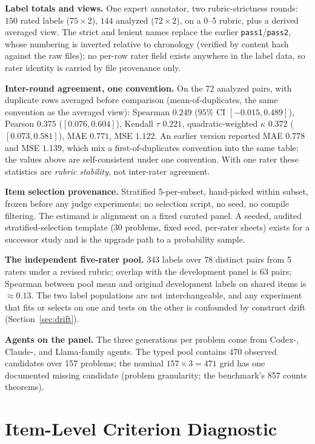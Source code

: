 \documentclass{article}
\begin{document}
\textbf{Label totals and views.}
One expert annotator, two rubric-strictness rounds: $150$ rated labels ($75 \times 2$), $144$ analyzed ($72 \times 2$), on a 0--5 rubric, plus a derived averaged view.
The strict and lenient names replace the earlier \texttt{pass1}/\texttt{pass2}, whose numbering is inverted relative to chronology (verified by content hash against the raw files); no per-row rater field exists anywhere in the label data, so rater identity is carried by file provenance only.

\textbf{Inter-round agreement, one convention.}
On the 72 analyzed pairs, with duplicate rows averaged before comparison (mean-of-duplicates, the same convention as the averaged view): Spearman $0.249$ ($95\%$ CI $[-0.015, 0.489]$), Pearson $0.375$ ($[0.076, 0.604]$), Kendall $\tau$ $0.221$, quadratic-weighted $\kappa$ $0.372$ ($[0.073, 0.581]$), MAE $0.771$, MSE $1.122$.
An earlier version reported MAE $0.778$ and MSE $1.139$, which mix a first-of-duplicates convention into the same table; the values above are self-consistent under one convention.
With one rater these statistics are \emph{rubric stability}, not inter-rater agreement.

\textbf{Item selection provenance.}
Stratified 5-per-subset, hand-picked within subset, frozen before any judge experiments; no selection script, no seed, no compile filtering.
The estimand is alignment on a fixed curated panel.
A seeded, audited stratified-selection template (30 problems, fixed seed, per-rater sheets) exists for a successor study and is the upgrade path to a probability sample.

\textbf{The independent five-rater pool.}
343 labels over 78 distinct pairs from 5 raters under a revised rubric; overlap with the development panel is 63 pairs; Spearman between pool mean and original development labels on shared items is $\approx 0.13$.
The two label populations are not interchangeable, and any experiment that fits or selects on one and tests on the other is confounded by construct drift (Section~\ref{sec:drift}).

\textbf{Agents on the panel.}
The three generations per problem come from Codex-, Claude-, and Llama-family agents. The typed pool contains 470 observed candidates over 157 problems; the nominal $157 \times 3=471$ grid has one documented missing candidate (problem granularity; the benchmark's 857 counts theorems).

\section{Item-Level Criterion Diagnostic}\label{app:ti2prime}
\end{document}
